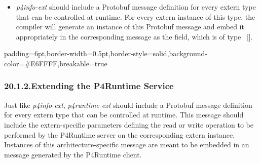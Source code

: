 \documentclass[11pt]{article}
\begin{document}
{\begin{itemize}[noitemsep,topsep=\mdcompacttopsep]
\item{}\emph{p4info-ext} should include a Protobuf message definition for every extern
type that can be controlled at runtime. For every extern instance of this
type, the compiler will generate an instance of this Protobuf message and
embed it appropriately in the corresponding
 message as the 
field, which is of type ~[].%
\end{itemize}%

\begin{mdbmargintb}{6pt}{6pt}%
\begin{mdblock}{padding=6pt,border-width=0.5pt,border-style=solid,background-color=\#E6FFFF,breakable=true}%
\begin{mdpre}%
\end{mdpre}%
\end{mdblock}%
\end{mdbmargintb}%

\subsubsection{20.1.2.\hspace*{0.5em}Extending the P4Runtime Service}\label{sec-extending-the-p4runtime-service}%

\noindent{}Just like \emph{p4info-ext}, \emph{p4runtime-ext} should include a Protobuf message
definition for every extern type that can be controlled at runtime. This message
should include the extern-specific parameters defining the read or write
operation to be performed by the P4Runtime server on the corresponding extern
instance. Instances of this architecture-specific message are meant to be
embedded in an~ message generated by the
P4Runtime client.%

}
\end{document}
